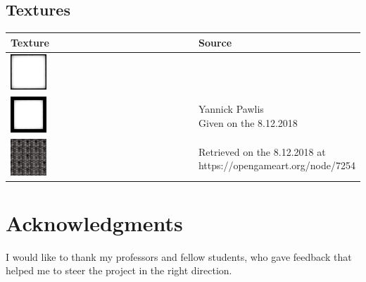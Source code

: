 \documentclass[a4paper, twoside, 10pt]{report}
\begin{document}
\section{Textures}
\begin{centering}
\begin{tabular}{l|l}
Texture & Source \\
\hline
\includegraphics[width=0.2\textwidth]{Images/BlackBorder.png} &  \\
\includegraphics[width=0.2\textwidth]{Images/BlackThickBorder.png} & 
\makecell[l]{Yannick Pawlis \\ Given on the 8.12.2018} \\
\hline
\includegraphics[width=0.2\textwidth]{Images/airbase_radar_panels.jpg} & 
\makecell[l]{Retrieved on the 8.12.2018 at \\ \linebreak https://opengameart.org/node/7254}
\end{tabular}
\end{centering}






\listoffigures



\chapter*{Acknowledgments}
I would like to thank my professors and fellow students, who gave feedback that helped me to steer the project in the right direction.
\end{document}
